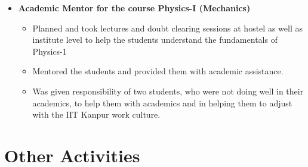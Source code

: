 \documentclass[margin,line]{resume}
\begin{document}
\begin{resume}
\begin{itemize}
  \item \textbf{\textsf Academic Mentor for the course Physics-I (Mechanics)}
    \begin{itemize}
    \item Planned and took lectures and doubt clearing sessions at hostel as well as institute level to help the students understand the fundamentals of Physics-1
    \item Mentored the students and provided them with academic assistance.
    \item Was given responsibility of two students, who were not doing well in their academics, to help them with academics and in helping them to adjust with the IIT Kanpur work culture.
    \end{itemize}
    

  \end{itemize}

  
  \section{\mysidestyle Other Activities}
  
  \begin{itemize}
    

\end{itemize}
\end{resume}
\end{document}
